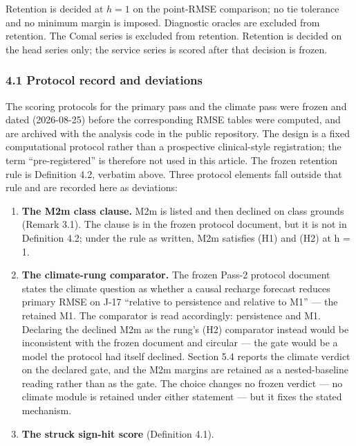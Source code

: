 \documentclass[11pt]{article}
\providecommand{\tightlist}{\setlength{\itemsep}{0.2em}\setlength{\parskip}{0pt}}
\begin{document}
Retention is decided at \(h=1\) on the point-RMSE comparison; no tie
tolerance and no minimum margin is imposed. Diagnostic oracles are
excluded from retention. The Comal series is excluded from retention.
Retention is decided on the head series only; the service series is
scored after that decision is frozen.

\subsubsection{4.1 Protocol record and
deviations}\label{protocol-record-and-deviations}

The scoring protocols for the primary pass and the climate pass were
frozen and dated (2026-08-25) before the corresponding RMSE tables were
computed, and are archived with the analysis code in the public
repository. The design is a fixed computational protocol rather than a
prospective clinical-style registration; the term ``pre-registered'' is
therefore not used in this article. The frozen retention rule is
Definition 4.2, verbatim above. Three protocol elements fall outside
that rule and are recorded here as deviations:

\begin{enumerate}
\def\labelenumi{\arabic{enumi}.}
\tightlist
\item
  \textbf{The M2m class clause.} M2m is listed and then declined on
  class grounds (Remark 3.1). The clause is in the frozen protocol
  document, but it is not in Definition 4.2; under the rule as written,
  M2m satisfies (H1) and (H2) at h = 1.
\item
  \textbf{The climate-rung comparator.} The frozen Pass-2 protocol
  document states the climate question as whether a causal recharge
  forecast reduces primary RMSE on J-17 ``relative to persistence and
  relative to M1'' --- the retained M1. The comparator is read
  accordingly: persistence and M1. Declaring the declined M2m as the
  rung's (H2) comparator instead would be inconsistent with the frozen
  document and circular --- the gate would be a model the protocol had
  itself declined. Section 5.4 reports the climate verdict on the
  declared gate, and the M2m margins are retained as a nested-baseline
  reading rather than as the gate. The choice changes no frozen verdict
  --- no climate module is retained under either statement --- but it
  fixes the stated mechanism.
\item
  \textbf{The struck sign-hit score} (Definition 4.1).
\end{enumerate}
\end{document}
